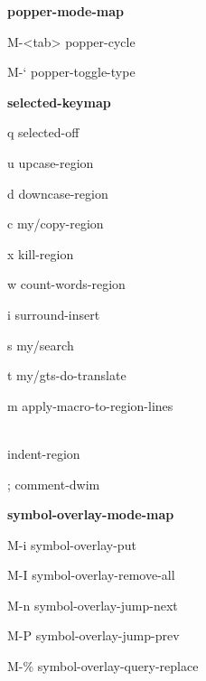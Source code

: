 \documentclass[10pt]{article}
\renewcommand\subsection[1]{\smallskip\par\textbf{\color{heading}#1}}
\begin{document}
\begin{multicols}{4}
  \subsection{popper-mode-map}
  \begin{keylist}
  \item[M-<tab>] popper-cycle
  \item[M-`] popper-toggle-type
  \end{keylist}

  \subsection{selected-keymap}
  \begin{keylist}
  \item[q] selected-off
  \item[u] upcase-region
  \item[d] downcase-region
  \item[c] my/copy-region
  \item[x] kill-region
  \item[w] count-words-region
  \item[i] surround-insert
  \item[s] my/search
  \item[t] my/gts-do-translate
  \item[m] apply-macro-to-region-lines
  \item[\\] indent-region
  \item[;] comment-dwim
  \end{keylist}

  \subsection{symbol-overlay-mode-map}
  \begin{keylist}
  \item[M-i] symbol-overlay-put
  \item[M-I] symbol-overlay-remove-all
  \item[M-n] symbol-overlay-jump-next
  \item[M-P] symbol-overlay-jump-prev
  \item[M-\%] symbol-overlay-query-replace
  \end{keylist}

\end{multicols}
\end{document}
